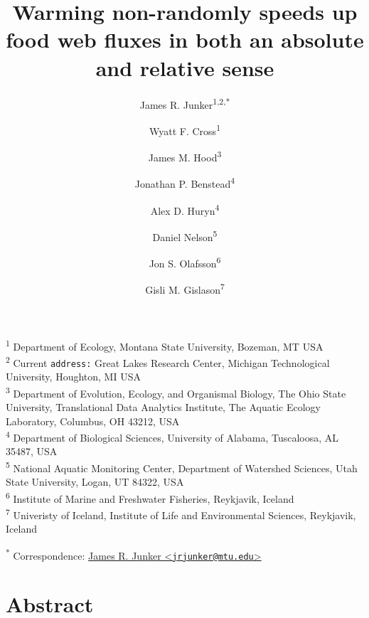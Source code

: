 \documentclass[
]{article}
\title{Warming non-randomly speeds up food web fluxes in both an
absolute and relative sense}
\author{James R. Junker\textsuperscript{1,2,*} \and Wyatt F.
Cross\textsuperscript{1} \and James M.
Hood\textsuperscript{3} \and Jonathan P.
Benstead\textsuperscript{4} \and Alex D.
Huryn\textsuperscript{4} \and Daniel Nelson\textsuperscript{5} \and Jon
S. Olafsson\textsuperscript{6} \and Gisli M.
Gislason\textsuperscript{7}}
\date{}
\begin{document}
\maketitle

\textsuperscript{1} Department of Ecology, Montana State University,
Bozeman, MT USA\\
\textsuperscript{2} Current \texttt{address:} Great Lakes Research
Center, Michigan Technological University, Houghton, MI USA\\
\textsuperscript{3} Department of Evolution, Ecology, and Organismal
Biology, The Ohio State University, Translational Data Analytics
Institute, The Aquatic Ecology Laboratory, Columbus, OH 43212, USA\\
\textsuperscript{4} Department of Biological Sciences, University of
Alabama, Tuscaloosa, AL 35487, USA\\
\textsuperscript{5} National Aquatic Monitoring Center, Department of
Watershed Sciences, Utah State University, Logan, UT 84322, USA\\
\textsuperscript{6} Institute of Marine and Freshwater Fisheries,
Reykjavik, Iceland\\
\textsuperscript{7} Univeristy of Iceland, Institute of Life and
Environmental Sciences, Reykjavik, Iceland

\textsuperscript{*} Correspondence:
\href{mailto:jrjunker@mtu.edu}{James R. Junker
\textless{}\href{mailto:jrjunker@mtu.edu}{\nolinkurl{jrjunker@mtu.edu}}\textgreater{}}

\newpage

\hypertarget{abstract}{%
\section{Abstract}\label{abstract}}
\end{document}
